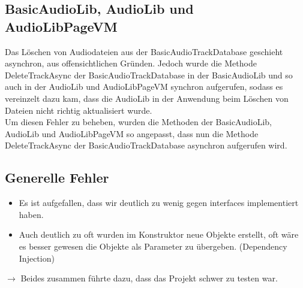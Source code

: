 \documentclass[../validierung.tex]{subfiles}
\begin{document}
	\subsection{BasicAudioLib, AudioLib und AudioLibPageVM}
		Das Löschen von Audiodateien aus der BasicAudioTrackDatabase geschieht asynchron, aus offensichtlichen Gründen. Jedoch wurde die Methode 
		DeleteTrackAsync der BasicAudioTrackDatabase in der BasicAudioLib und so auch in der AudioLib und AudioLibPageVM synchron aufgerufen, sodass es 
		vereinzelt dazu kam, dass die AudioLib in der Anwendung beim Löschen von Dateien nicht richtig aktualisiert wurde.\\ Um diesen Fehler zu beheben, 
		wurden die Methoden der BasicAudioLib, AudioLib und AudioLibPageVM so angepasst, dass nun die Methode DeleteTrackAsync der BasicAudioTrackDatabase 
		asynchron aufgerufen wird.

	\subsection{Generelle Fehler}
		\begin{itemize}
			\item Es ist aufgefallen, dass wir deutlich zu wenig gegen interfaces implementiert haben.
			\item Auch deutlich zu oft wurden im Konstruktor neue Objekte erstellt, oft wäre es besser gewesen die Objekte als Parameter zu übergeben. (Dependency Injection)
		\end{itemize}
		$\rightarrow$ Beides zusammen führte dazu, dass das Projekt schwer zu testen war.
\end{document}
